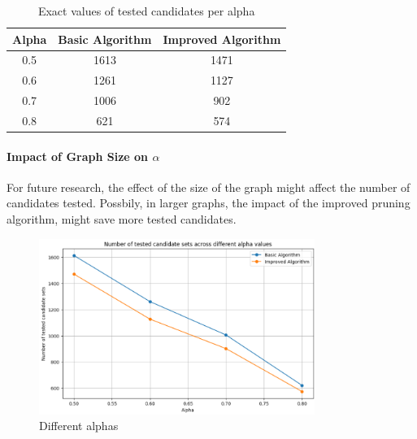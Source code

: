 \begin{table}[h]
    \centering
    \begin{tabular}{ccc}
        \hline
        Alpha & Basic Algorithm & Improved Algorithm \\
        \hline
        0.5   & 1613            & 1471               \\
        0.6   & 1261            & 1127               \\
        0.7   & 1006            & 902                \\
        0.8   & 621             & 574                \\
        \hline
    \end{tabular}
    \caption{Exact values of tested candidates per alpha}
\end{table}


\paragraph{Impact of Graph Size on \(\alpha\)}
For future research, the effect of the size of the graph might affect the number of candidates tested. Possbily, in larger graphs, the impact of the improved pruning algorithm, might save more tested candidates.

\begin{figure}[h]
    \centering
    \includegraphics[width=0.8\textwidth]
    {figures/improved_algorithm.png}
    \caption{Different alphas}
    \label{fig:improved_algorithm}
\end{figure}
